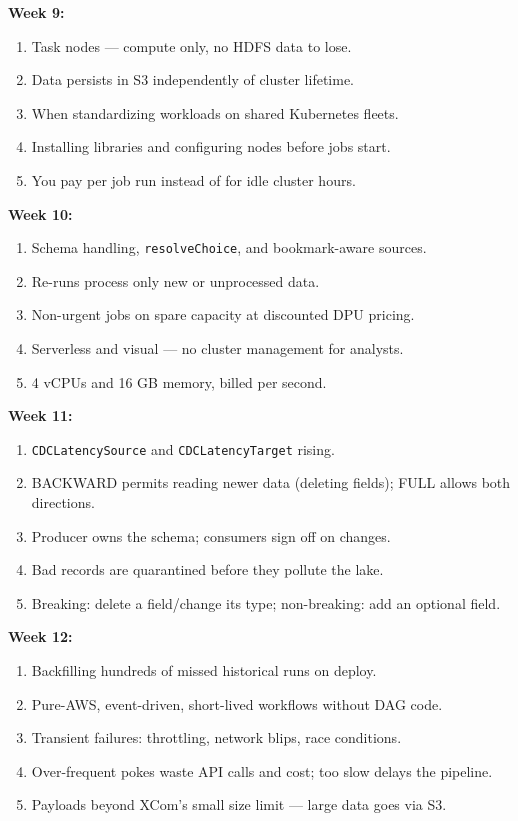 \documentclass[11pt, a4paper]{article}
\begin{document}
\noindent\textbf{Week 9:}
\begin{enumerate}[itemsep=0pt, leftmargin=2em]
    \item Task nodes --- compute only, no HDFS data to lose.
    \item Data persists in S3 independently of cluster lifetime.
    \item When standardizing workloads on shared Kubernetes fleets.
    \item Installing libraries and configuring nodes before jobs start.
    \item You pay per job run instead of for idle cluster hours.
\end{enumerate}
\noindent\textbf{Week 10:}
\begin{enumerate}[itemsep=0pt, leftmargin=2em]
    \item Schema handling, \texttt{resolveChoice}, and bookmark-aware sources.
    \item Re-runs process only new or unprocessed data.
    \item Non-urgent jobs on spare capacity at discounted DPU pricing.
    \item Serverless and visual --- no cluster management for analysts.
    \item 4 vCPUs and 16 GB memory, billed per second.
\end{enumerate}
\noindent\textbf{Week 11:}
\begin{enumerate}[itemsep=0pt, leftmargin=2em]
    \item \texttt{CDCLatencySource} and \texttt{CDCLatencyTarget} rising.
    \item BACKWARD permits reading newer data (deleting fields); FULL allows both directions.
    \item Producer owns the schema; consumers sign off on changes.
    \item Bad records are quarantined before they pollute the lake.
    \item Breaking: delete a field/change its type; non-breaking: add an optional field.
\end{enumerate}
\noindent\textbf{Week 12:}
\begin{enumerate}[itemsep=0pt, leftmargin=2em]
    \item Backfilling hundreds of missed historical runs on deploy.
    \item Pure-AWS, event-driven, short-lived workflows without DAG code.
    \item Transient failures: throttling, network blips, race conditions.
    \item Over-frequent pokes waste API calls and cost; too slow delays the pipeline.
    \item Payloads beyond XCom's small size limit --- large data goes via S3.
\end{enumerate}
\end{document}
